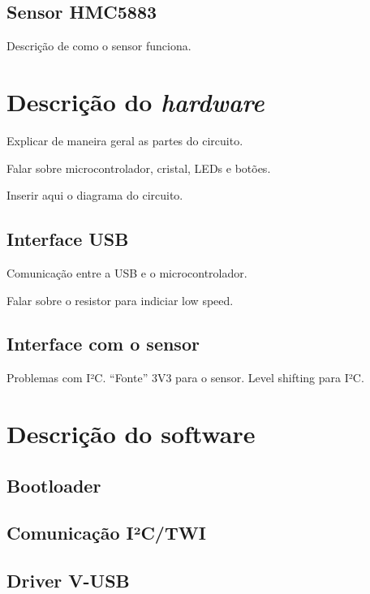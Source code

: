 \documentclass[brazil,pagestart=firstchapter]{abnt}
\begin{document}
\section{Sensor HMC5883\label{sec:sensor}}

Descrição de como o sensor funciona.


\chapter{Descrição do \textit{hardware}\label{cap:hardware}}

Explicar de maneira geral as partes do circuito.

Falar sobre microcontrolador, cristal, LEDs e botões.

Inserir aqui o diagrama do circuito.

\section{Interface USB\label{sec:hardware_usb}}

Comunicação entre a USB e o microcontrolador.

Falar sobre o resistor para indiciar low speed.

\section{Interface com o sensor\label{sec:hardware_sensor}}

Problemas com I²C. ``Fonte'' 3V3 para o sensor. Level shifting para I²C.


\chapter{Descrição do software\label{cap:software}}

\section{Bootloader\label{sec:bootloader}}

\section{Comunicação I²C/TWI\label{sec:twi}}

\section{Driver V-USB\label{sec:vusb}}
\end{document}

